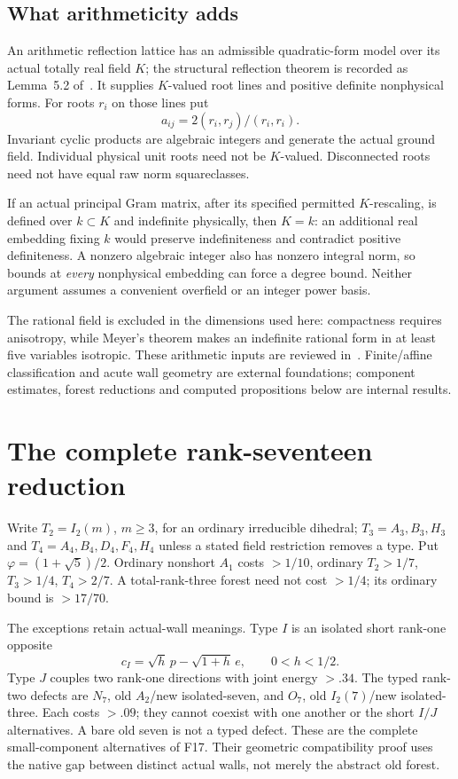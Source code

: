 \documentclass[11pt]{article}
\newcommand{\supp}[1]{\textsf{#1}}
\begin{document}
\subsection{What arithmeticity adds}
An arithmetic reflection lattice has an admissible quadratic-form
model over its actual totally real field $K$; the structural reflection
theorem is recorded as Lemma~5.2 of~\cite{ABSW}. It supplies $K$-valued
root lines and positive definite nonphysical forms. For roots $r_i$ on
those lines put
\[
 a_{ij}=2(r_i,r_j)/(r_i,r_i).
\]
Invariant cyclic products are algebraic integers and generate the
actual ground field. Individual physical unit roots need not be
$K$-valued. Disconnected roots need not have equal raw norm squareclasses.

If an actual principal Gram matrix, after its specified permitted
$K$-rescaling, is defined over $k\subset K$ and indefinite physically,
then $K=k$: an additional real embedding fixing $k$ would preserve
indefiniteness and contradict positive definiteness.
A nonzero algebraic integer also has nonzero integral norm, so bounds
at \emph{every} nonphysical embedding can force a degree bound.
Neither argument assumes a convenient overfield or an integer power basis.

The rational field is excluded in the dimensions used here: compactness
requires anisotropy, while Meyer's theorem makes an indefinite rational
form in at least five variables isotropic. These arithmetic inputs are
reviewed in~\cite{Belolipetsky}. Finite/affine classification and acute
wall geometry are external foundations; component estimates, forest
reductions and computed propositions below are internal results.

\section{The complete rank-seventeen reduction}\label{sec:seventeen}

Write $T_2=I_2(m)$, $m\ge3$, for an ordinary irreducible dihedral;
$T_3=A_3,B_3,H_3$ and $T_4=A_4,B_4,D_4,F_4,H_4$ unless a stated
field restriction removes a type. Put $\varphi=(1+\sqrt5)/2$.
Ordinary nonshort $A_1$ costs
$>1/10$, ordinary $T_2>1/7$, $T_3>1/4$, $T_4>2/7$.
A total-rank-three forest need not cost $>1/4$; its ordinary bound
is $>17/70$.

The exceptions retain actual-wall meanings. Type $I$ is an isolated
short rank-one opposite
\[
 c_I=\sqrt h\,p-\sqrt{1+h}\,e,\qquad0<h<1/2.
\]
Type $J$ couples two rank-one directions with joint energy $>.34$.
The typed rank-two defects are $N_7$, old $A_2$/new isolated-seven,
and $O_7$, old $I_2(7)$/new isolated-three. Each costs $>.09$;
they cannot coexist with one another or the short $I/J$ alternatives.
A bare old seven is not a typed defect.
These are the complete small-component alternatives of \supp{F17}.
Their geometric compatibility proof uses the native gap between
distinct actual walls, not merely the abstract old forest.
\end{document}

